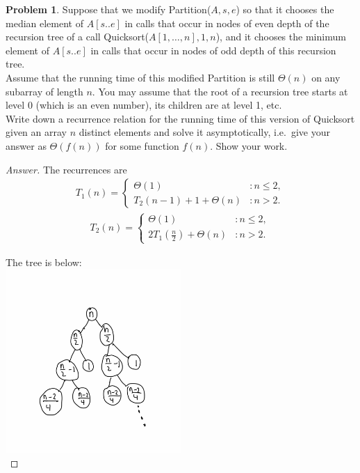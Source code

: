 \documentclass[11pt]{article}
\theoremstyle{definition}
\theoremstyle{definition}
\newtheorem{required}{Problem}
\theoremstyle{definition}
\begin{document}
\begin{required}

Suppose that we modify {\sc Partition}($A,s,e$) so that it chooses the median element of $A[s..e]$ in calls that occur in nodes of even depth of the recursion tree of a call {\sc Quicksort}($A[1, \ldots, n],1, n$), and it chooses the minimum element of $A[s..e]$ in calls that occur in nodes of odd depth of this recursion tree. \\
  
\noindent Assume that the running time of this modified {\sc Partition} is still $\Theta(n)$ on any subarray of length $n$. You may assume that the root of a recursion tree starts at level $0$ (which is an even number), its children are at level 1, etc. \\
  
\noindent Write down a recurrence relation for the running time of this version of {\sc Quicksort} given an array $n$ distinct elements and solve it asymptotically, i.e.\ give your answer as $\Theta(f(n))$ for some function $f(n)$. Show your work.

\begin{proof}[Answer]
The recurrences are \\
\begin{align*}
T_1(n) = \begin{cases}
\Theta(1) & : n \leq 2, \\
T_2(n-1) + 1+ \Theta(n) & : n > 2.
\end{cases}
\end{align*}
\begin{align*}
T_2(n) = \begin{cases}
\Theta(1) & : n \leq 2, \\
2T_1(\frac{n}{2}) + \Theta(n) & : n > 2.
\end{cases}
\end{align*}

The tree is below: \\
\includegraphics[width=0.5\textwidth]{Hw6Q3} \\


\end{proof}
\end{required}
\end{document}
